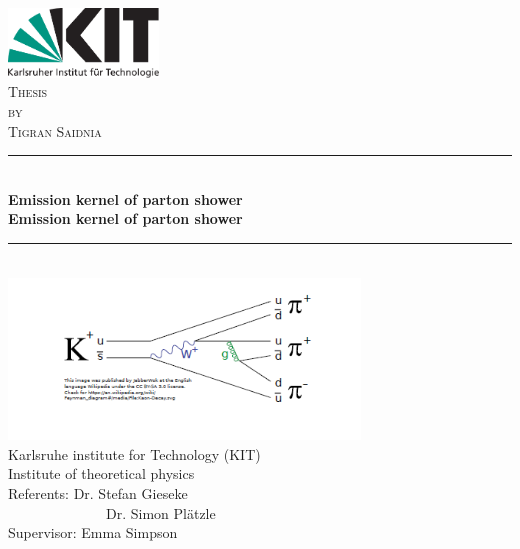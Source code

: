 \begin{titlepage}

\begin{center}


\includegraphics[width=0.3\textwidth]{images/kitlogo_de_rgb}\\[1cm]    

\textsc{\LARGE Thesis}\\[0.5cm]
\textsc{\Large by}\\[0.5cm]
\textsc{\Large Tigran Saidnia}\\[1.5cm]


\newcommand{\HRule}{\rule{\linewidth}{0.5mm}}
\HRule \\[0.8mm]
{\textbf{\Large \bfseries Emission kernel of parton shower}}\\[0.8mm]

{\textbf{\bfseries Emission kernel of parton shower}}\\[0.8mm]

\HRule \\[1cm]
\includegraphics[width=0.7\textwidth]{images/pp.PNG}\\[1cm]   
\Large Karlsruhe institute for Technology (KIT)\\[1.5mm]
\Large Institute of theoretical physics\\[1.5cm]
\Large Referents: Dr. Stefan Gieseke \\
\Large ~~~~~~~~~~~~~~Dr. Simon Plätzle\\

\Large Supervisor: Emma Simpson\\

\vfill


\end{center}

\end{titlepage}